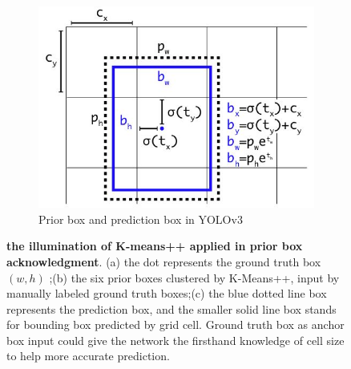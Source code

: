 \begin{figure}[h]
\begin{center}
\begin{subfigure}[b]{0.49\textwidth}
			\includegraphics[width=\textwidth]{thesis-template-master/images/anchor.JPG}
			\caption{ Prior box and prediction box in YOLOv3\cite{33}}
			
		\end{subfigure}
	\end{center}
	\caption{\textbf{the illumination of K-means++ applied in prior box acknowledgment}. (a) the dot represents the ground truth box$(w,h)$ ;(b) the six prior boxes clustered by K-Means++,  input by manually labeled ground truth boxes;(c)  the blue dotted line box represents the prediction box, and the smaller solid line box stands for bounding box predicted by grid cell.  Ground truth box as anchor box input could give the network the firsthand knowledge of cell size to help more accurate prediction.}
\end{figure}

